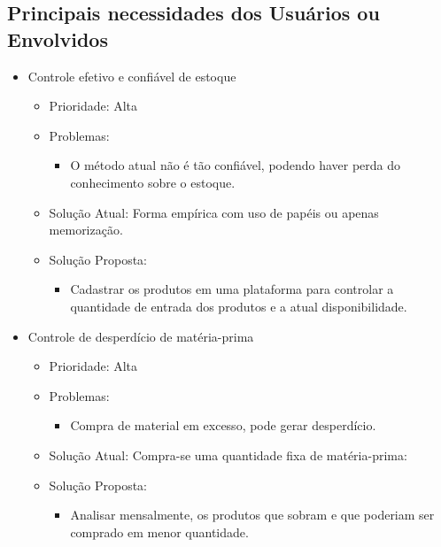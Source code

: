 \begin{appendices}
\begin{itemize}
\end{itemize}

\subsection{Principais necessidades dos Usuários ou Envolvidos}

\begin{itemize}

\item Controle efetivo e confiável de estoque
	
	\begin{itemize}
		\item Prioridade: Alta
		\item Problemas:
			\begin{itemize}
				\item O método atual não é tão confiável, podendo haver perda do conhecimento sobre o estoque.
			\end{itemize}
		\item Solução Atual: Forma empírica com uso de papéis ou apenas memorização.
		\item Solução Proposta:
			\begin{itemize}
				\item Cadastrar os produtos em uma plataforma para controlar a quantidade de entrada dos produtos e a atual disponibilidade.
			\end{itemize}
	\end{itemize}

\item Controle de desperdício de matéria-prima

	\begin{itemize}
		\item Prioridade: Alta
		\item Problemas:
			\begin{itemize}
			\item Compra de material em excesso, pode gerar desperdício.
			\end{itemize}
		\item Solução Atual: Compra-se uma quantidade fixa de matéria-prima:
		\item Solução Proposta:
			\begin{itemize}
				\item Analisar mensalmente, os produtos que sobram e que poderiam ser comprado em menor quantidade.
			\end{itemize}
	\end{itemize}


\end{itemize}
\end{appendices}
